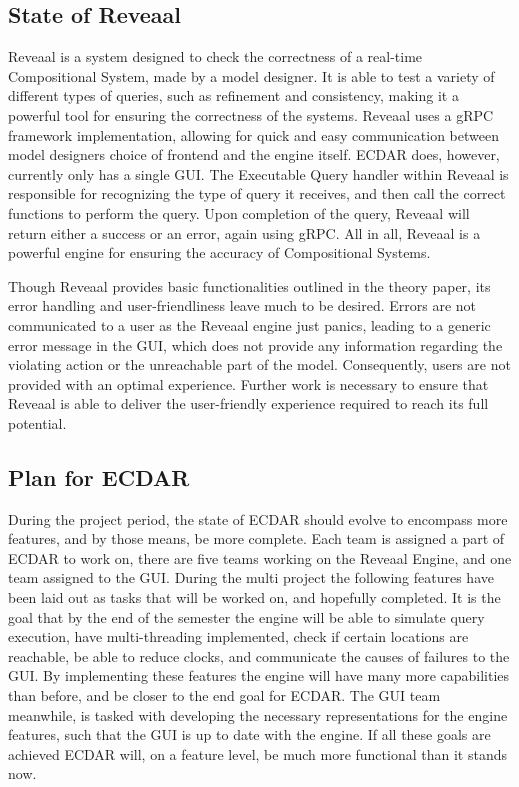 \subsection{State of Reveaal}
Reveaal is a system designed to check the correctness of a real-time Compositional System, made by a model designer. It is able to test a variety of different types of queries, such as refinement and consistency, making it a powerful tool for ensuring the correctness of the systems. Reveaal uses a gRPC framework implementation, allowing for quick and easy communication between model designers choice of frontend and the engine itself. ECDAR does, however, currently only has a single GUI. The Executable Query handler within Reveaal is responsible for recognizing the type of query it receives, and then call the correct functions to perform the query. Upon completion of the query, Reveaal will return either a success or an error, again using gRPC. All in all, Reveaal is a powerful engine for ensuring the accuracy of Compositional Systems.

Though Reveaal provides basic functionalities outlined in the theory paper, its error handling and user-friendliness leave much to be desired. Errors are not communicated to a user as the Reveaal engine just panics, leading to a generic error message in the GUI, which does not provide any information regarding the violating action or the unreachable part of the model. Consequently, users are not provided with an optimal experience. Further work is necessary to ensure that Reveaal is able to deliver the user-friendly experience required to reach its full potential.

\subsection{Plan for ECDAR} \label{sec:plan-for-ecdar}
During the project period, the state of ECDAR should evolve to encompass more features, and by those means, be more complete. Each team is assigned a part of ECDAR to work on, there are five teams working on the Reveaal Engine, and one team assigned to the GUI. During the multi project the following features have been laid out as tasks that will be worked on, and hopefully completed. It is the goal that by the end of the semester the engine will be able to simulate query execution, have multi-threading implemented, check if certain locations are reachable, be able to reduce clocks, and communicate the causes of failures to the GUI. By implementing these features the engine will have many more capabilities than before, and be closer to the end goal for ECDAR. The GUI team meanwhile, is tasked with developing the necessary representations for the engine features, such that the GUI is up to date with the engine. If all these goals are achieved ECDAR will, on a feature level, be much more functional than it stands now.

